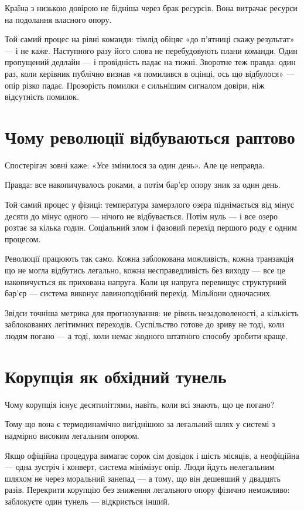 \documentclass[12pt, a4paper, openany]{book}
\begin{document}
Країна з низькою довірою не бідніша через брак ресурсів. Вона витрачає ресурси на подолання власного опору.

\begin{analogybox}
Той самий процес на рівні команди: тімлід обіцяє «до п'ятниці скажу результат» — і не каже. Наступного разу його слова не перебудовують плани команди. Один пропущений дедлайн — і провідність падає на тижні. Зворотне теж правда: один раз, коли керівник публічно визнав «я помилився в оцінці, ось що відбулося» — опір різко падає. Прозорість помилки є сильнішим сигналом довіри, ніж відсутність помилок.
\end{analogybox}

\section{Чому революції відбуваються раптово}

Спостерігач зовні каже: «Усе змінилося за один день». Але це неправда.

Правда: все накопичувалось роками, а потім бар'єр опору зник за один день.

Той самий процес у фізиці: температура замерзлого озера піднімається від мінус десяти до мінус одного --- нічого не відбувається. Потім нуль --- і все озеро розтає за кілька годин. Соціальний злом і фазовий перехід першого роду є одним процесом.

Революції працюють так само. Кожна заблокована можливість, кожна транзакція що не могла відбутись легально, кожна несправедливість без виходу --- все це накопичується як прихована напруга. Коли ця напруга перевищує структурний бар'єр --- система виконує лавиноподібний перехід. Мільйони одночасних.

Звідси точніша метрика для прогнозування: не рівень незадоволеності, а кількість заблокованих легітимних переходів. Суспільство готове до зриву не тоді, коли людям погано --- а тоді, коли немає жодного штатного способу зробити краще.

\section{Корупція як обхідний тунель}

Чому корупція існує десятиліттями, навіть, коли всі знають, що це погано?

Тому що вона є термодинамічно вигіднішою за легальний шлях у системі з надмірно високим легальним опором.

Якщо офіційна процедура вимагає сорок сім довідок і шість місяців, а неофіційна --- одна зустріч і конверт, система мінімізує опір. Люди йдуть нелегальним шляхом не через моральний занепад --- а тому, що він дешевший у двадцять разів. Перекрити корупцію без зниження легального опору фізично неможливо: заблокуєте один тунель --- відкриється інший.
\end{document}
